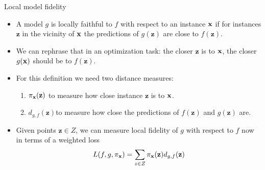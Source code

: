 \documentclass[11pt,compress,t,notes=noshow, xcolor=table]{beamer}
\newcommand{\Gspace}{\mathcal{G}}
\newcommand{\neigh}{\pi_{\xv}}
\newcommand{\zv}{\mathbf{z}}
\begin{document}
 	\begin{vbframe}{Local model fidelity}
 		\begin{itemize}
 			\item A model $g$ is locally faithful to $f$ with respect to an instance $\xv$ if for instances $\zv$ in the vicinity of $\xv$ the predictions of $g(\zv)$ are close to $f(\zv)$. 
 			 \item We can rephrase that in an optimization task: the closer $\zv$ is to $\xv$, the closer $g(\xv)$ should be to $f(\zv)$.  
 			\item For this definition we need two distance measures:
 			\begin{enumerate}
 				\item $\neigh(\zv)$ to measure how close instance $\zv$ is to $\xv$. \label{first}
 				\item $d_{g, f}(\zv)$to measure how close the predictions of $f(\zv)$ and $g(\zv)$ are. \label{second}
 			\end{enumerate}
 	
 			\item Given points $\zv \in Z$, we can measure local fidelity of $g$ with respect to $f$ now in terms of a weighted loss
 			$$L(f, g, \neigh) = \sum_{z \in Z} \neigh(\zv) d_{g,f}(\zv)$$
 		\end{itemize}
\end{vbframe}
\end{document}
